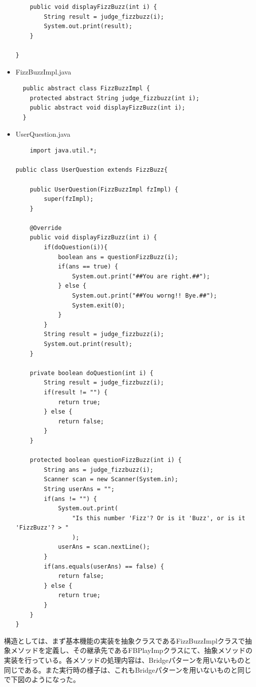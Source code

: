 \documentclass[dvipdfmx]{jsarticle}
\begin{document}
\begin{itemize}
\begin{verbatim}
    public void displayFizzBuzz(int i) {
        String result = judge_fizzbuzz(i);
        System.out.print(result);
    }

}
  \end{verbatim}
  \item FizzBuzzImpl.java
  \begin{verbatim}
  public abstract class FizzBuzzImpl {
    protected abstract String judge_fizzbuzz(int i);
    public abstract void displayFizzBuzz(int i);
  }
  \end{verbatim}
  \item UserQuestion.java
  \begin{verbatim}
    import java.util.*;

public class UserQuestion extends FizzBuzz{

    public UserQuestion(FizzBuzzImpl fzImpl) {
        super(fzImpl);
    }

    @Override
    public void displayFizzBuzz(int i) {
        if(doQuestion(i)){
            boolean ans = questionFizzBuzz(i);
            if(ans == true) {
                System.out.print("##You are right.##");
            } else {
                System.out.print("##You worng!! Bye.##");
                System.exit(0);
            }
        }
        String result = judge_fizzbuzz(i);
        System.out.print(result);
    }

    private boolean doQuestion(int i) {
        String result = judge_fizzbuzz(i);
        if(result != "") {
            return true;
        } else {
            return false;
        }
    }

    protected boolean questionFizzBuzz(int i) {
        String ans = judge_fizzbuzz(i);
        Scanner scan = new Scanner(System.in);
        String userAns = "";
        if(ans != "") {
            System.out.print(
                "Is this number 'Fizz'? Or is it 'Buzz', or is it 'FizzBuzz'? > "
                );
            userAns = scan.nextLine();
        }
        if(ans.equals(userAns) == false) {
            return false;
        } else {
            return true;
        }
    }
}
  \end{verbatim}
\end{itemize}
構造としては、まず基本機能の実装を抽象クラスであるFizzBuzzImplクラスで抽象メソッドを定義し、その継承先であるFBPlayImpクラスにて、抽象メソッドの実装を行っている。各メソッドの処理内容は、Bridgeパターンを用いないものと同じである。また実行時の様子は、これもBridgeパターンを用いないものと同じで下図のようになった。\par
\end{document}
